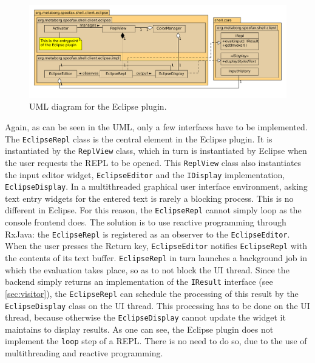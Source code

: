 \begin{figure}[h]
  \includegraphics[width=\textwidth]{uml-eclipse}
  \caption{UML diagram for the Eclipse plugin.}
  \label{fig:uml-eclipse}
\end{figure}

Again, as can be seen in the UML, only a few interfaces have to be implemented.
The \texttt{EclipseRepl} class is the central element in the Eclipse plugin.
It is instantiated by the \texttt{ReplView} class, which in turn is
instantiated by Eclipse when the user requests the REPL to be opened. This
\texttt{ReplView} class also instantiates the input editor widget,
\texttt{EclipseEditor} and the \texttt{IDisplay} implementation,
\texttt{EclipseDisplay}.
In a multithreaded graphical user interface environment, asking text entry
widgets for the entered text is rarely a blocking process. This is no different
in Eclipse. For this reason, the \texttt{EclipseRepl} cannot simply loop as the
console frontend does. The solution is to use reactive programming through RxJava:
the \texttt{EclipseRepl} is registered as an observer to the
\texttt{EclipseEditor}. When the user presses the Return key,
\texttt{EclipseEditor} notifies \texttt{EclipseRepl} with the contents of its
text buffer. \texttt{EclipseRepl} in turn launches a background job in which the
evaluation takes place, so as to not block the UI thread. Since the backend
simply returns an implementation of the \texttt{IResult} interface (see
\cref{sec:visitor}), the \texttt{EclipseRepl} can schedule the processing of this
result by the \texttt{EclipseDisplay} class on the UI thread. This processing
has to be done on the UI thread, because otherwise the \texttt{EclipseDisplay}
cannot update the widget it maintains to display results.
As one can see, the Eclipse plugin does not implement the \texttt{loop} step of
a REPL. There is no need to do so, due to the use of multithreading and reactive
programming.

